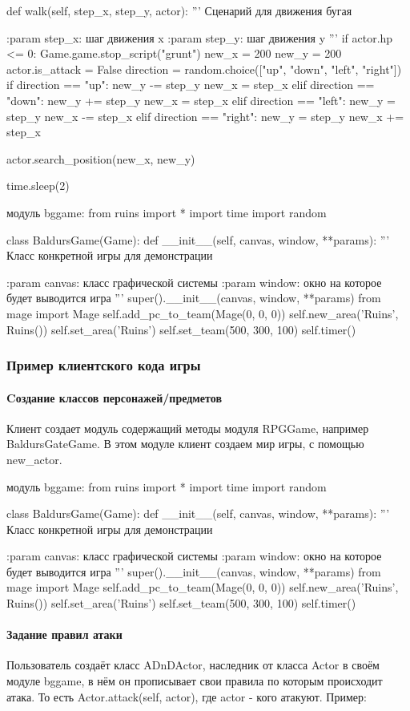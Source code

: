 def walk(self, step\_x, step\_y, actor):
'''
Сценарий для движения бугая

:param step\_x: шаг движения x
:param step\_y: шаг движения y
'''
if actor.hp <= 0:
Game.game.stop\_script("grunt")
new\_x = 200
new\_y = 200
actor.is\_attack = False
direction = random.choice(["up", "down", "left", "right"])
if direction == "up":
new\_y -= step\_y
new\_x = step\_x
elif direction == "down":
new\_y += step\_y
new\_x = step\_x
elif direction == "left":
new\_y = step\_y
new\_x -= step\_x
elif direction == "right":
new\_y = step\_y
new\_x += step\_x

actor.search\_position(new\_x, new\_y)

time.sleep(2)

модуль bggame:
from ruins import *
import time
import random

class BaldursGame(Game):
def \_\_init\_\_(self, canvas, window, **params):
'''
Класс конкретной игры для демонстрации

:param canvas: класс графической системы
:param window: окно на которое будет выводится игра
'''
super().\_\_init\_\_(canvas, window, **params)
from mage import Mage
self.add\_pc\_to\_team(Mage(0, 0, 0))
self.new\_area('Ruins', Ruins())
self.set\_area('Ruins')
self.set\_team(500, 300, 100)
self.timer()

\subsubsection{Пример клиентского кода игры}
\paragraph{Cоздание классов персонажей/предметов}
Клиент создает модуль содержащий методы модуля RPGGame, например BaldursGateGame. В этом модуле клиент создаем мир игры, с помощью new\_actor. 

модуль bggame:
from ruins import *
import time
import random

class BaldursGame(Game):
def \_\_init\_\_(self, canvas, window, **params):
'''
Класс конкретной игры для демонстрации

:param canvas: класс графической системы
:param window: окно на которое будет выводится игра
'''
super().\_\_init\_\_(canvas, window, **params)
from mage import Mage
self.add\_pc\_to\_team(Mage(0, 0, 0))
self.new\_area('Ruins', Ruins())
self.set\_area('Ruins')
self.set\_team(500, 300, 100)
self.timer()

\paragraph{Задание правил атаки}
Пользователь создаёт класс ADnDActor, наследник от класса Actor в своём модуле bggame, в нём он прописывает свои правила по которым происходит атака. То есть Actor.attack(self, actor), где actor - кого атакуют.
Пример:


